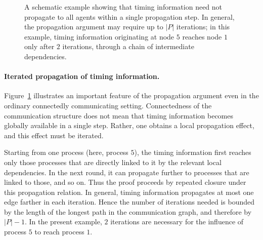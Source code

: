 \begin{example}
\begin{figure}[t]
\caption{A schematic example showing that timing information need not propagate
to all agents within a single propagation step. In general, the propagation
argument may require up to \(|P|\) iterations; in this example, timing
information originating at node \(5\) reaches node \(1\) only after \(2\)
iterations, through a chain of intermediate dependencies.}
\label{fig:multiple-iterations}
\end{figure}

\paragraph{Iterated propagation of timing information.} Figure~\ref{fig:multiple-iterations} illustrates an important feature of the
propagation argument even in the ordinary connectedly communicating setting.
Connectedness of the communication structure does not mean that timing
information becomes globally available in a single step. Rather, one obtains a
local propagation effect, and this effect must be iterated.

Starting from one process (here, process \(5\)), the timing information first
reaches only those processes that are directly linked to it by the relevant local
dependencies. In the next round, it can propagate further to processes that are
linked to those, and so on. Thus the proof proceeds by repeated closure under
this propagation relation. In general, timing information propagates at most one edge farther in each iteration. Hence the number of iterations needed is bounded by the length of the longest path in the communication graph, and therefore by \(|P|-1\). In the present example, \(2\) iterations are necessary for the influence of process
\(5\) to reach process \(1\).


\end{example}
